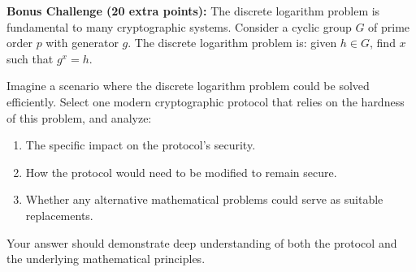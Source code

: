 \documentclass[10pt,a4paper,american]{article}
\begin{document}
\begin{tcolorbox}[colframe=EarthBrown!30!white,colback=EarthBrown!5!white]
	\textbf{Bonus Challenge (20 extra points):} The discrete logarithm problem is fundamental to many cryptographic systems. Consider a cyclic group $G$ of prime order $p$ with generator $g$. The discrete logarithm problem is: given $h \in G$, find $x$ such that $g^x = h$.

	Imagine a scenario where the discrete logarithm problem could be solved efficiently. Select one modern cryptographic protocol that relies on the hardness of this problem, and analyze:

	\begin{enumerate}
		\item The specific impact on the protocol's security.
		\item How the protocol would need to be modified to remain secure.
		\item Whether any alternative mathematical problems could serve as suitable replacements.
	\end{enumerate}

	Your answer should demonstrate deep understanding of both the protocol and the underlying mathematical principles.
\end{tcolorbox}
\end{document}
